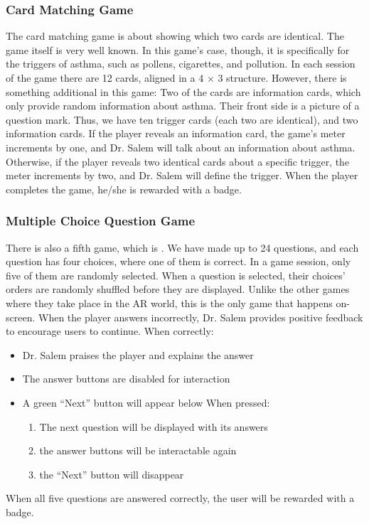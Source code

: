 \subsubsection*{Card Matching Game}
The card matching game is about showing which two cards are identical. The game itself is very well known. In this game’s case, though, it is specifically for the triggers of asthma, such as pollens, cigarettes, and pollution. In each session of the game there are 12 cards, aligned in a 4 × 3 structure. However, there is something additional in this game: Two of the cards are information cards, which only provide random information about asthma. Their front side is a picture of a question mark. Thus, we have ten trigger cards (each two are identical), and two information cards. If the player reveals an information card, the game’s meter increments by one, and Dr. Salem will talk about an information about asthma. Otherwise, if the player reveals two identical cards about a specific trigger, the meter increments by two, and Dr. Salem will define the trigger. When the player completes the game, he/she is rewarded with a badge.
\subsubsection*{Multiple Choice Question Game}
There is also a fifth game, which is . We have made up to 24 questions, and each question has four choices, where one of them is correct. In a game session, only five of them are randomly selected. When a question is selected, their choices' orders are randomly shuffled before they are displayed. Unlike the other games where they take place in the \acrshort{AR} world, this is the only game that happens on-screen. When the player answers incorrectly, Dr. Salem provides positive feedback to encourage users to continue. When correctly:
\begin{itemize}
\item{Dr. Salem praises the player and explains the answer}

\item{The answer buttons are disabled for interaction}

\item{A green “Next” button will appear below When pressed:
\begin{enumerate}
\item{The next question will be displayed with its answers}
\item{the answer buttons will be interactable again}
\item{the “Next” button will disappear}
\end{enumerate}
}
\end{itemize}
When all five questions are answered correctly, the user will be rewarded with a badge.
